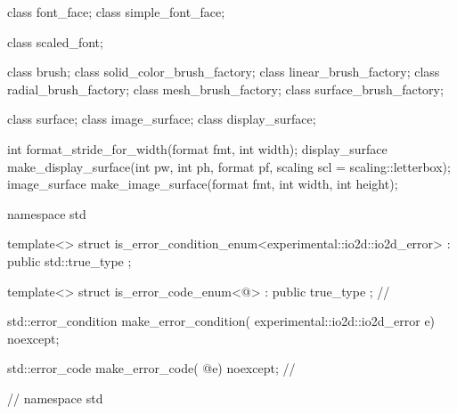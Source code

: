 \begin{codeblock}
{{{{  class font_face;
  class simple_font_face;

  class scaled_font;

  class brush;
  class solid_color_brush_factory;
  class linear_brush_factory;
  class radial_brush_factory;
  class mesh_brush_factory;
  class surface_brush_factory;
  
  class surface;
  class image_surface;
  class display_surface;
  
  int format_stride_for_width(format fmt, int width);
  display_surface make_display_surface(int pw, int ph, format pf,
    scaling scl = scaling::letterbox);
  image_surface make_image_surface(format fmt, int width, int height);
} } } }

namespace std {
	template<>
	struct is_error_condition_enum<experimental::io2d::io2d_error>
		: public std::true_type{ };

	template<>
	struct is_error_code_enum<@\impdef@>
		: public true_type{ }; // \expos

	std::error_condition make_error_condition(
	  experimental::io2d::io2d_error e) noexcept;

	std::error_code make_error_code(
	  @\impdef@ e) noexcept; // \expos
} // namespace std

\end{codeblock}
%
